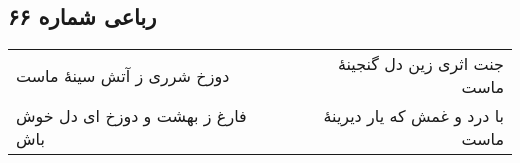 \begin{center}
\section*{رباعی شماره ۶۶}
\label{sec:sh066}
\begin{longtable}{l p{0.5cm} r}
دوزخ شرری ز آتش سینهٔ ماست
&&
جنت اثری زین دل گنجینهٔ ماست
\\
فارغ ز بهشت و دوزخ ای دل خوش باش
&&
با درد و غمش که یار دیرینهٔ ماست
\\
\end{longtable}
\end{center}
